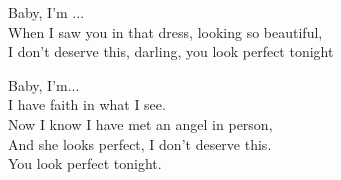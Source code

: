 \cho{}
Baby, I'm ...\\   
When I saw you in that dress, looking so beautiful,\\
I don't deserve this, darling, you look perfect tonight\\

\cho{}
Baby, I'm...\\  
I have faith in what I see.\\
Now I know I have met an angel in person,\\
And she looks perfect, I don't deserve this.\\
You look perfect tonight.\\

\esong
